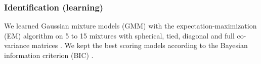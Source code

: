 \subsubsection{Identification (learning)}
We learned Gaussian mixture models (GMM) with the expectation-maximization (EM) algorithm on 5 to 15 mixtures with spherical, tied, diagonal and full co-variance matrices \cite{scikit-learn}. We kept the best scoring models according to the Bayesian information criterion (BIC) \cite{schwarz1978}. %

